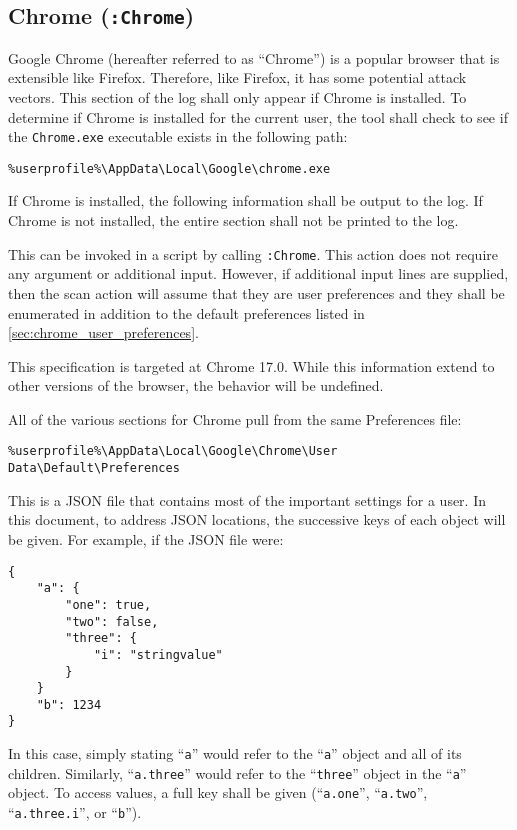 \subsection{Chrome (\texttt{:Chrome})}
Google Chrome (hereafter referred to as ``Chrome'') is a popular browser that is
extensible like Firefox.  Therefore, like Firefox, it has some potential attack
vectors.  This section of the log shall only appear if Chrome is installed.  To
determine if Chrome is installed for the current user, the tool shall check to
see if the \texttt{Chrome.exe} executable exists in the following path:
\begin{verbatim}
%userprofile%\AppData\Local\Google\chrome.exe
\end{verbatim}

If Chrome is installed, the following information shall be output to the log. 
If Chrome is not installed, the entire section shall not be printed to the log.

This can be invoked in a script by calling \verb|:Chrome|.  This action does
not require any argument or additional input.  However, if additional input
lines are supplied, then the scan action will assume that they are user
preferences and they shall be enumerated in addition to the default preferences
listed in \ref{sec:chrome_user_preferences}.

This specification is targeted at Chrome 17.0.  While this information extend
to other versions of the browser, the behavior will be undefined.  

All of the various sections for Chrome pull from the same Preferences file:
\begin{verbatim}
%userprofile%\AppData\Local\Google\Chrome\User Data\Default\Preferences
\end{verbatim}
This is a JSON file that contains most of the important settings for a user.  In
this document, to address JSON locations, the successive keys of each object
will be given.  For example, if the JSON file were:
\begin{verbatim}
{
    "a": {
        "one": true,
        "two": false,
        "three": {
            "i": "stringvalue"
        }
    }
    "b": 1234
}
\end{verbatim}
In this case, simply stating ``\texttt{a}'' would refer to the ``\texttt{a}''
object and all of its children.  Similarly, ``\texttt{a.three}'' would refer to
the ``\texttt{three}'' object in the ``\texttt{a}'' object.  To access values,
a full key shall be given (``\texttt{a.one}'', ``\texttt{a.two}'',
``\texttt{a.three.i}'', or ``\texttt{b}'').  

